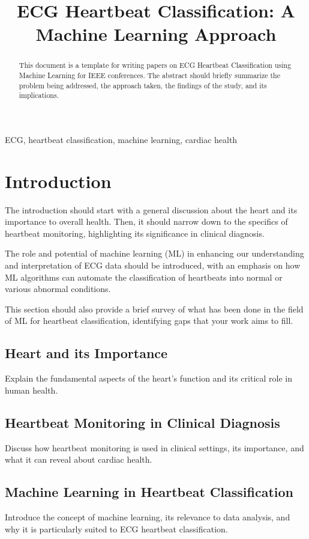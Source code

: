 \documentclass[conference]{IEEEtran}
\title{ECG Heartbeat Classification: A Machine Learning Approach}
\begin{document}
\maketitle

\begin{abstract}
This document is a template for writing papers on ECG Heartbeat Classification using Machine Learning for IEEE conferences. The abstract should briefly summarize the problem being addressed, the approach taken, the findings of the study, and its implications.
\end{abstract}

\begin{IEEEkeywords}
ECG, heartbeat classification, machine learning, cardiac health
\end{IEEEkeywords}

\section{Introduction}
The introduction should start with a general discussion about the heart and its importance to overall health. Then, it should narrow down to the specifics of heartbeat monitoring, highlighting its significance in clinical diagnosis. 

The role and potential of machine learning (ML) in enhancing our understanding and interpretation of ECG data should be introduced, with an emphasis on how ML algorithms can automate the classification of heartbeats into normal or various abnormal conditions. 

This section should also provide a brief survey of what has been done in the field of ML for heartbeat classification, identifying gaps that your work aims to fill.

\subsection{Heart and its Importance}
Explain the fundamental aspects of the heart's function and its critical role in human health.

\subsection{Heartbeat Monitoring in Clinical Diagnosis}
Discuss how heartbeat monitoring is used in clinical settings, its importance, and what it can reveal about cardiac health.

\subsection{Machine Learning in Heartbeat Classification}
Introduce the concept of machine learning, its relevance to data analysis, and why it is particularly suited to ECG heartbeat classification.
\end{document}
